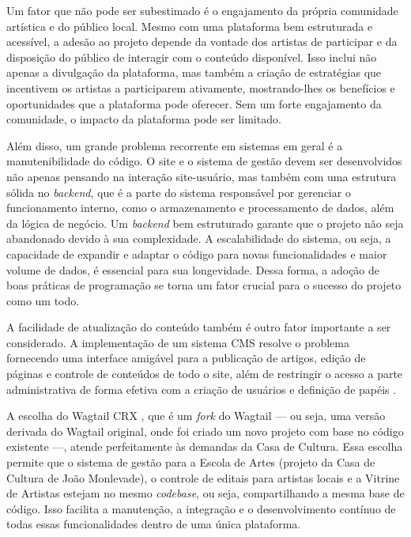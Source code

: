Um fator que não pode ser subestimado é o engajamento da própria comunidade artística e do público local. Mesmo com uma plataforma bem estruturada e acessível, a adesão ao projeto depende da vontade dos artistas de participar e da disposição do público de interagir com o conteúdo disponível. Isso inclui não apenas a divulgação da plataforma, mas também a criação de estratégias que incentivem os artistas a participarem ativamente, mostrando-lhes os benefícios e oportunidades que a plataforma pode oferecer. Sem um forte engajamento da comunidade, o impacto da plataforma pode ser limitado.

Além disso, um grande problema recorrente em sistemas em geral é a manutenibilidade do código. O site e o sistema de gestão devem ser desenvolvidos não apenas pensando na interação site-usuário, mas também com uma estrutura sólida no \textit{backend}, que é a parte do sistema responsável por gerenciar o funcionamento interno, como o armazenamento e processamento de dados, além da lógica de negócio. Um \textit{backend} bem estruturado garante que o projeto não seja abandonado devido à sua complexidade. A escalabilidade do sistema, ou seja, a capacidade de expandir e adaptar o código para novas funcionalidades e maior volume de dados, é essencial para sua longevidade. Dessa forma, a adoção de boas práticas de programação se torna um fator crucial para o sucesso do projeto como um todo.

A facilidade de atualização do conteúdo também é outro fator importante a ser considerado. A implementação de um sistema \ac{CMS} resolve o problema fornecendo uma interface amigável para a publicação de artigos, edição de páginas e controle de conteúdos de todo o site, além de restringir o acesso a parte administrativa de forma efetiva com a criação de usuários e definição de papéis \cite{Baker2013}. 

A escolha do Wagtail CRX \cite{WagtailCRX}, que é um \textit{fork} do Wagtail \cite{Wagtail} — ou seja, uma versão derivada do Wagtail original, onde foi criado um novo projeto com base no código existente —, atende perfeitamente às demandas da Casa de Cultura. Essa escolha permite que o sistema de gestão para a Escola de Artes (projeto da Casa de Cultura de João Monlevade), o controle de editais para artistas locais e a Vitrine de Artistas estejam no mesmo \textit{codebase}, ou seja, compartilhando a mesma base de código. Isso facilita a manutenção, a integração e o desenvolvimento contínuo de todas essas funcionalidades dentro de uma única plataforma.

